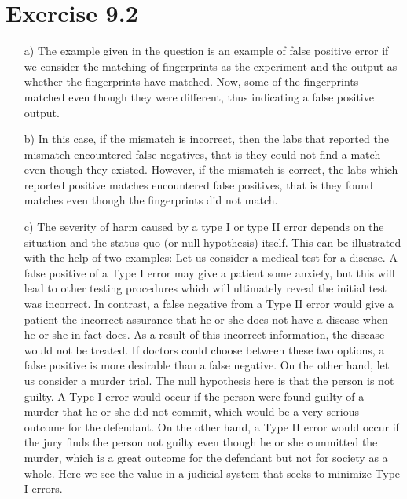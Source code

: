 \documentclass[a4paper]{article}
\begin{document}
\section*{Exercise 9.2}
\begin{enumerate}
	\item[a)] The example given in the question is an example of false positive error if we consider the matching of fingerprints as the experiment and the output as whether the fingerprints have matched. Now, some of the fingerprints matched even though they were different, thus indicating a false positive output.
	\item[b)] In this case, if the mismatch is incorrect, then the labs that reported the mismatch encountered false negatives, that is they could not find a match even though they existed. However, if the mismatch is correct, the labs which reported positive matches encountered false positives, that is they found matches even though the fingerprints did not match.
	\item[c)] The severity of harm caused by a type I or type II error depends on the situation and the status quo (or null hypothesis) itself. This can be illustrated with the help of two examples:\linebreak\linebreak
Let us consider a medical test for a disease. A false positive of a Type I error may give a patient some anxiety, but this will lead to other testing procedures which will ultimately reveal the initial test was incorrect. In contrast, a false negative from a Type II error would give a patient the incorrect assurance that he or she does not have a disease when he or she in fact does. As a result of this incorrect information, the disease would not be treated. If doctors could choose between these two options, a false positive is more desirable than a false negative.\linebreak
On the other hand, let us consider a murder trial. The null hypothesis here is that the person is not guilty. A Type I error would occur if the person were found guilty of a murder that he or she did not commit, which would be a very serious outcome for the defendant. On the other hand, a Type II error would occur if the jury finds the person not guilty even though he or she committed the murder, which is a great outcome for the defendant but not for society as a whole. Here we see the value in a judicial system that seeks to minimize Type I errors.
\end{enumerate}
\end{document}
